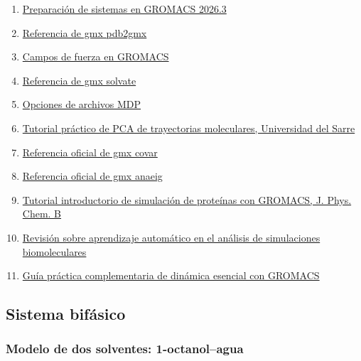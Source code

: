 \documentclass[
  spanish,
  11pt,
  a4paper]{article}
\providecommand{\tightlist}{%
  \setlength{\itemsep}{0pt}\setlength{\parskip}{0pt}}
\begin{document}
\begin{enumerate}
\def\labelenumi{\arabic{enumi}.}
\tightlist
\item
  \href{https://manual.gromacs.org/current/user-guide/system-preparation.html}{Preparación
  de sistemas en GROMACS 2026.3}
\item
  \href{https://manual.gromacs.org/current/onlinehelp/gmx-pdb2gmx.html}{Referencia
  de gmx pdb2gmx}
\item
  \href{https://manual.gromacs.org/current/user-guide/force-fields.html}{Campos
  de fuerza en GROMACS}
\item
  \href{https://manual.gromacs.org/current/onlinehelp/gmx-solvate.html}{Referencia
  de gmx solvate}
\item
  \href{https://manual.gromacs.org/current/user-guide/mdp-options.html}{Opciones
  de archivos MDP}
\item
  \href{https://biophys.uni-saarland.de/courses/comp-mol-bio/pract06/}{Tutorial
  práctico de PCA de trayectorias moleculares, Universidad del Sarre}
\item
  \href{https://manual.gromacs.org/current/onlinehelp/gmx-covar.html\#gmx-covar}{Referencia
  oficial de gmx covar}
\item
  \href{https://manual.gromacs.org/current/onlinehelp/gmx-anaeig.html\#gmx-anaeig}{Referencia
  oficial de gmx anaeig}
\item
  \href{https://pubs.acs.org/doi/10.1021/acs.jpcb.4c04050}{Tutorial
  introductorio de simulación de proteínas con GROMACS, J. Phys. Chem.
  B}
\item
  \href{https://www.tandfonline.com/doi/full/10.1080/23746149.2021.2006080}{Revisión
  sobre aprendizaje automático en el análisis de simulaciones
  biomoleculares}
\item
  \href{https://stemskillslab.com/how-to-do-pca-gromacs-trajectory-essential-dynamics/}{Guía
  práctica complementaria de dinámica esencial con GROMACS}
\end{enumerate}

\subsection{Sistema bifásico}\label{sistema-bifuxe1sico}

\subsubsection{Modelo de dos solventes:
1-octanol--agua}\label{modelo-de-dos-solventes-1-octanolagua}
\end{document}
